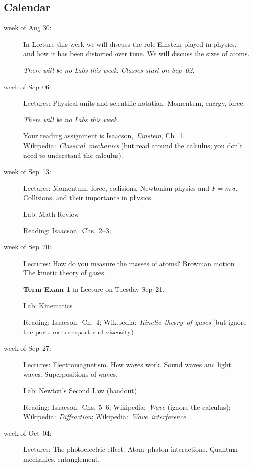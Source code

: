 \documentclass[12pt, letterpaper]{article}
\begin{document}
\subsection*{Calendar}\raggedright
\begin{description}
\item[week of Aug 30:] In Lecture this week we will discuss the role
  Einstein played in physics, and how it has been distorted over
  time.
  We will discuss the sizes of atoms.

  \textsl{There will be no Labs this week. Classes start on Sep~02.}

\item[week of Sep~06:] Lectures:
  Physical units and scientific notation.
  Momentum, energy, force.

  \textsl{There will be no Labs this week.}

  Your reading assignment is
  Isaacson,~\textit{Einstein}, Ch.~1.
  Wikipedia:~\textit{Classical~mechanics} (but read around the
  calculus; you don't need to understand the calculus).

\item[week of Sep~13:] Lectures: Momentum, force, collisions,
  Newtonian physics and $F=m\,a$.
  Collisions, and their importance in physics.

  Lab: Math Review

  Reading: Isaacson,~Chs.~2--3;

\item[week of Sep~20:] Lectures:
  How do you measure the masses of atoms? Brownian motion.
  The kinetic theory of gases.

  \textbf{Term Exam 1} in Lecture on Tuesday Sep~21.

  Lab: Kinematics

  Reading: Isaacson,~Ch.~4;
  Wikipedia:~\textit{Kinetic~theory~of~gases} (but ignore the parts on
  transport and viscosity).

\item[week of Sep~27:] Lectures: Electromagnetism. How waves
  work. Sound waves and light waves. Superpositions of waves.

  Lab: Newton's Second Law (handout)

  Reading:
  Isaacson,~Chs.~5--6;
  Wikipedia:~\textit{Wave} (ignore the calculus);
  Wikipedia:~\textit{Diffraction};
  Wikipedia:~\textit{Wave~interference}.

\item[week of Oct~04:] Lectures: The photoelectric effect.
  Atom--photon interactions. Quantum mechanics, entanglement.


\end{description}
\end{document}

